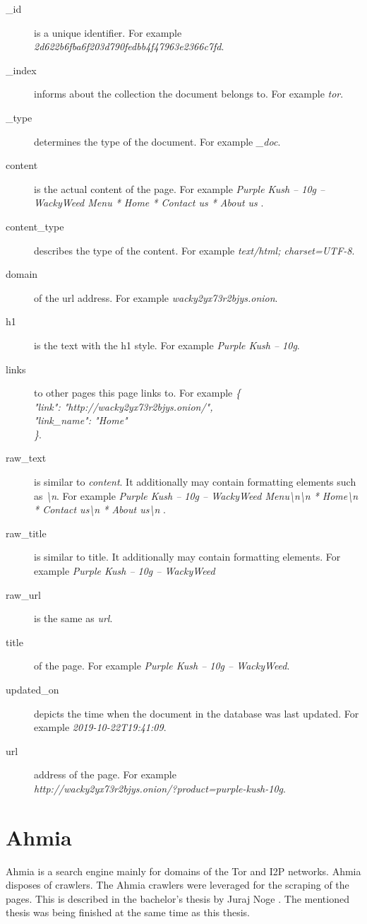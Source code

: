 \begin {description}
	\item[\_id \label{DWDataList}] is a unique identifier. For example\\ \textit{2d622b6fba6f203d790fedbb4f47963e2366c7fd}.
	\item[\_index] informs about the collection the document belongs to. For example \textit{tor}. 
	\item[\_type] determines the type of the document. For example \textit{\_doc}.
	\item[content] is the actual content of the page. For example \textit{Purple Kush – 10g – WackyWeed Menu    * Home   * Contact us   * About us }.
	\item[content\_type] describes the type of the content. For example \textit{text/html; charset=UTF-8}.
	\item[domain] of the url address. For example \textit{wacky2yx73r2bjys.onion}.
	\item[h1] is the text with the h1 style. For example \textit{Purple Kush – 10g}.
	\item[links] to other pages this page links to. For example \textit{\{\\
  "link": "http://wacky2yx73r2bjys.onion/",\\
  "link\_name": "Home"\\
\}}.
	\item[raw\_text] is similar to \textit{content}. It additionally may contain formatting elements such as \textit{\textbackslash n}. For example \textit{Purple Kush – 10g – WackyWeed Menu\textbackslash n\textbackslash n  * Home\textbackslash n  * Contact us\textbackslash n  * About us\textbackslash n }.
	\item[raw\_title] is similar to title. It additionally may contain formatting elements. For example \textit{Purple Kush – 10g – WackyWeed}
	\item[raw\_url] is the same as \textit{url}.
	\item[title] of the page. For example \textit{Purple Kush – 10g – WackyWeed}.
	\item[updated\_on] depicts the time when the document in the database was last updated. For example \textit{2019-10-22T19:41:09}.
	\item[url] address of the page. For example \\ \textit{http://wacky2yx73r2bjys.onion/?product=purple-kush-10g}.
\end{description}


\section{Ahmia} \label{ahmia}
Ahmia is a search engine mainly for domains of the Tor and I2P networks. Ahmia disposes of crawlers. The Ahmia crawlers were leveraged for the scraping of the pages. This is described in the bachelor's thesis by Juraj Noge \cite{bcScraping}. The mentioned thesis was being finished at the same time as this thesis.

